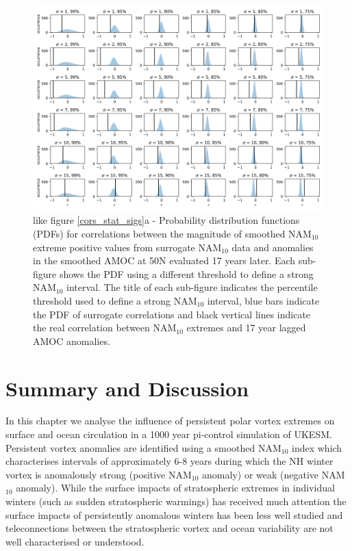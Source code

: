 \begin{landscape}
 \begin{figure}
\begin{center}
\noindent\includegraphics[width =\linewidth]{Figures/Figures-surface/cors_sigs_thresh_and_sigma.png} 
\caption{like figure \ref{cors_stat_sigs}a - Probability distribution functions (PDFs) for correlations between the magnitude of smoothed NAM$_{10}$ extreme positive values from surrogate NAM$_{10}$ data and anomalies in the smoothed AMOC at 50N evaluated 17 years later. Each sub-figure shows the PDF using a different threshold to define a strong NAM$_{10}$ interval. The title of each sub-figure indicates the percentile threshold used to define a strong NAM$_{10}$ interval, blue bars indicate the PDF of surrogate correlations and black vertical lines indicate the real correlation between NAM$_{10}$ extremes and 17 year lagged AMOC anomalies.}
\label{different_thresh_weak}
\end{center}
 \end{figure}
\end{landscape}







\section{Summary and Discussion}

In this chapter we analyse the influence of persistent polar vortex extremes on surface and ocean circulation in a 1000 year pi-control simulation of UKESM. Persistent vortex anomalies are identified using a smoothed NAM$_{10}$ index which characterises intervals of approximately 6-8 years during which the NH winter vortex is anomalously strong (positive NAM$_{10}$ anomaly) or weak (negative NAM$_{10}$ anomaly). While the surface impacts of stratospheric extremes in individual winters (such as sudden stratospheric warmings) has received much attention \citep{baldwinStratospheric2001a, domeisenEstimating2019, charlton-perezInfluence2018a} the surface impacts of persistently anomalous winters has been less well studied and  teleconnections between the stratospheric vortex and ocean variability are not well characterised or understood. 


